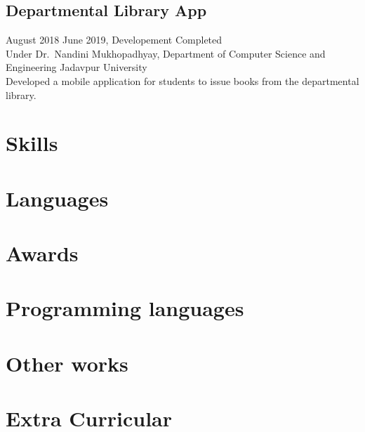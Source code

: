 \documentclass{article}
\begin{document}
\subsection{Departmental Library App}
August 2018 \- June 2019, Developement Completed\\
Under Dr.\ Nandini Mukhopadhyay,
Department of Computer Science and Engineering
Jadavpur University\\

Developed a mobile application for students to issue books from
the departmental library.




\section{Skills} 


\section{Languages} 


\section{Awards}


\section{Programming languages} 


\section{Other works} 


\section{Extra Curricular}
\end{document}
